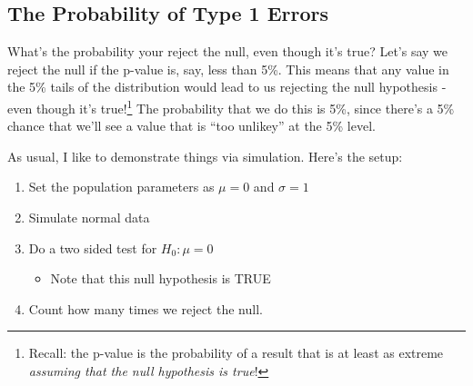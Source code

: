 \documentclass[
  letterpaper,
  DIV=11,
  numbers=noendperiod,
  oneside]{scrreprt}
\providecommand{\tightlist}{%
  \setlength{\itemsep}{0pt}\setlength{\parskip}{0pt}}\usepackage{longtable,booktabs,array}
\begin{document}
\hypertarget{the-probability-of-type-1-errors}{%
\subsection{The Probability of Type 1
Errors}\label{the-probability-of-type-1-errors}}

What's the probability your reject the null, even though it's true?
Let's say we reject the null if the p-value is, say, less than 5\%. This
means that any value in the 5\% tails of the distribution would lead to
us rejecting the null hypothesis - even though it's true!\footnote{Recall:
  the p-value is the probability of a result that is at least as extreme
  \emph{assuming that the null hypothesis is true}!} The probability
that we do this is 5\%, since there's a 5\% chance that we'll see a
value that is ``too unlikey'' at the 5\% level.

As usual, I like to demonstrate things via simulation. Here's the setup:

\begin{enumerate}
\def\labelenumi{\arabic{enumi}.}
\tightlist
\item
  Set the population parameters as \(\mu = 0\) and
  \(\sigma = 1\)\newline
\item
  Simulate normal data\newline
\item
  Do a two sided test for \(H_0: \mu = 0\)

  \begin{itemize}
  \tightlist
  \item
    Note that this null hypothesis is TRUE\newline
  \end{itemize}
\item
  Count how many times we reject the null.
\end{enumerate}
\end{document}
